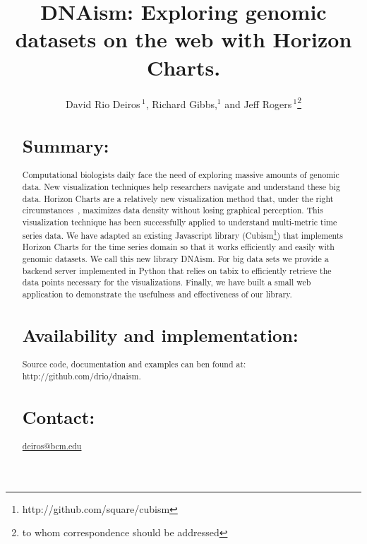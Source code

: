 \documentclass{bioinfo}
\begin{document}

\title[short Title]{DNAism: Exploring genomic datasets on the web with Horizon Charts. }
\author[Sample \textit{et~al}]{David Rio Deiros\,$^{1}$, Richard Gibbs,$^{1}$ and Jeff Rogers\,$^1$\footnote{to whom correspondence should be addressed}}
\address{$^{1}$Department of Genomics, Baylor College of Medicine. }



\maketitle

\begin{abstract}

\section{Summary:}

Computational biologists daily face the need of exploring massive amounts of
genomic data. New visualization techniques help researchers navigate and
understand these big data. Horizon Charts are a relatively new visualization
method that, under the right circumstances~\citep{2009-horizon}, maximizes data
density without losing graphical perception. This visualization technique has
been successfully applied to understand multi-metric time series data. We have
adapted an existing Javascript library
(Cubism\footnote{http://github.com/square/cubism}) that implements Horizon
Charts for the time series domain so that it works efficiently and easily with
genomic datasets. We call this new library DNAism. For big data sets we provide
a backend server implemented in Python that relies on tabix\citep{tabix-li} to
efficiently retrieve the data points necessary for the visualizations. Finally,
we have built a small web application to demonstrate the usefulness and
effectiveness of our library.

\section{Availability and implementation:}
Source code, documentation and examples can ben found at: http://github.com/drio/dnaism.

\section{Contact:} \href{deiros@bcm.edu}{deiros@bcm.edu}
\end{abstract}
\end{document}
